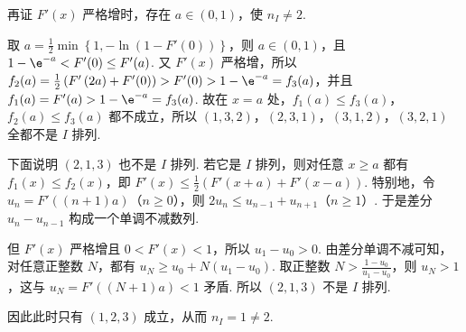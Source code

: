 \begin{solution}
\begin{enumerate}
再证 \( F'(x) \) 严格增时，存在 \( a\in \left( 0,1 \right) \)，使 \( n_I\neq 2 \).

取 \( a=\frac{1}{2}\min\left\{ 1,-\ln\left( 1-F'(0) \right) \right\} \)，则 \( a\in \left( 0,1 \right) \)，且 \( 1-\e^{-a}<F'(0)\le F'(a) \). 又 \( F'(x) \) 严格增，所以 \( f_2(a)=\frac{1}{2}\left( F'\left( 2a \right)+F'(0) \right)>F'(0)>1-\e^{-a}=f_3(a) \)，并且 \( f_1(a)=F'(a)>1-\e^{-a}=f_3(a) \). 故在 \( x=a \) 处，\( f_1(a)\le f_3(a) \)，\( f_2(a)\le f_3(a) \) 都不成立，所以 \( \left( 1,3,2 \right) \)，\( \left( 2,3,1 \right) \)，\( \left( 3,1,2 \right) \)，\( \left( 3,2,1 \right) \) 全都不是 \(I\) 排列.

下面说明 \( \left( 2,1,3 \right) \) 也不是 \(I\) 排列. 若它是 \(I\) 排列，则对任意 \( x\ge a \) 都有 \( f_1(x)\le f_2(x) \)，即 \( F'(x)\le \frac{1}{2}\left( F'\left( x+a \right)+F'\left( x-a \right) \right) \). 特别地，令 \( u_n=F'\left( \left( n+1 \right)a \right) \)（\( n\ge 0 \)），则 \( 2u_n\le u_{n-1}+u_{n+1} \)（\( n\ge 1 \)）. 于是差分 \( u_n-u_{n-1} \) 构成一个单调不减数列.

但 \( F'(x) \) 严格增且 \( 0<F'(x)<1 \)，所以 \( u_1-u_0>0 \). 由差分单调不减可知，对任意正整数 \(N\)，都有 \( u_N\ge u_0+N\left( u_1-u_0 \right) \). 取正整数 \( N>\frac{1-u_0}{u_1-u_0} \)，则 \( u_N>1 \)，这与 \( u_N=F'\left( \left( N+1 \right)a \right)<1 \) 矛盾. 所以 \( \left( 2,1,3 \right) \) 不是 \(I\) 排列.

因此此时只有 \( \left( 1,2,3 \right) \) 成立，从而 \( n_I=1\neq 2 \).
\end{enumerate}
\end{solution}
